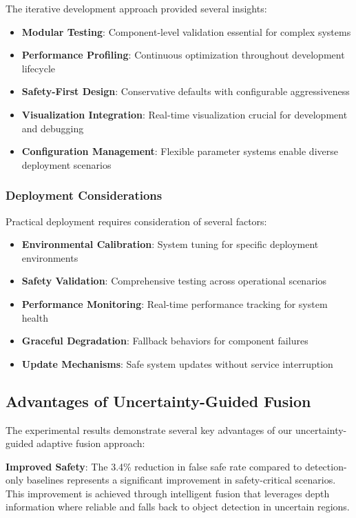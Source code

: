 \documentclass[10pt]{article}
\begin{document}
The iterative development approach provided several insights:

\begin{itemize}
\item \textbf{Modular Testing}: Component-level validation essential for complex systems
\item \textbf{Performance Profiling}: Continuous optimization throughout development lifecycle
\item \textbf{Safety-First Design}: Conservative defaults with configurable aggressiveness
\item \textbf{Visualization Integration}: Real-time visualization crucial for development and debugging
\item \textbf{Configuration Management}: Flexible parameter systems enable diverse deployment scenarios
\end{itemize}

\subsubsection{Deployment Considerations}

Practical deployment requires consideration of several factors:

\begin{itemize}
\item \textbf{Environmental Calibration}: System tuning for specific deployment environments
\item \textbf{Safety Validation}: Comprehensive testing across operational scenarios
\item \textbf{Performance Monitoring}: Real-time performance tracking for system health
\item \textbf{Graceful Degradation}: Fallback behaviors for component failures
\item \textbf{Update Mechanisms}: Safe system updates without service interruption
\end{itemize}

\subsection{Advantages of Uncertainty-Guided Fusion}

The experimental results demonstrate several key advantages of our uncertainty-guided adaptive fusion approach:

\textbf{Improved Safety}: The 3.4\% reduction in false safe rate compared to detection-only baselines represents a significant improvement in safety-critical scenarios. This improvement is achieved through intelligent fusion that leverages depth information where reliable and falls back to object detection in uncertain regions.
\end{document}
